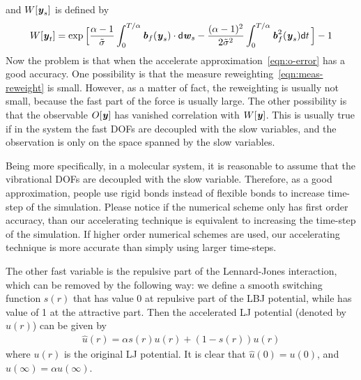 \documentclass[aip,jcp,a4paper,reprint,onecolumn]{revtex4-1}
\newcommand{\vect}[1]{\textbf{\textit{#1}}}
\newcommand{\dd}{\textsf{d}}
\begin{document}
and $W[\vect y_s]$ is defined by
\begin{align}\label{eqn:error-exp}
  W[\vect y_t] = 
  \exp
  \Big[
  \frac{\alpha-1}{\tilde{\sigma}}\int_0^{T/\alpha}\vect b_f(\vect y_s)\cdot\dd\vect w_s
  -
  \frac{(\alpha-1)^2}{2\tilde\sigma^2} \int_0^{T/\alpha}\vect b_f^2(\vect y_s)\dd t\,
  \Big]
  -1
\end{align}
Now the problem is that when the accelerate
approximation~\eqref{eqn:o-error} has a good accuracy. One possibility
is that the measure reweighting~\eqref{eqn:meas-reweight} is small.
However, as a matter of fact, the reweighting is usually not small,
because the fast part of the force is usually large. The other possibility
is that the observable $O[\vect y]$ has vanished correlation with
$W[\vect y]$.
This is usually true if in the system the fast DOFs are decoupled with
the slow variables, and the observation is only on the space spanned
by the slow variables.


Being more specifically, in a molecular system, it is reasonable to
assume that the vibrational DOFs are decoupled with the slow variable.
Therefore, as a good approximation, people use rigid bonds instead of
flexible bonds to increase time-step of the simulation. Please notice
if the numerical scheme only has first order accuracy, than our accelerating
technique is equivalent to increasing the time-step of the simulation.
If higher order numerical schemes are used, our accelerating technique
is more accurate than simply using larger time-steps.

The other fast variable is the repulsive part of the Lennard-Jones
interaction, which can be removed by the following way: we define a
smooth switching function $s(r)$ that has value 0 at repulsive part of
the LBJ potential, while has value of 1 at the attractive part. Then
the accelerated LJ potential (denoted by $\hat u(r)$) can be given by
\begin{align}
  \hat u(r) = \alpha s(r) u(r) + (1 - s(r)) u(r)
\end{align}
where $u(r)$ is the original LJ potential. It is clear that
$\hat u(0) = u(0)$, and $\hat u(\infty) = \alpha u(\infty)$.
\\
\end{document}
